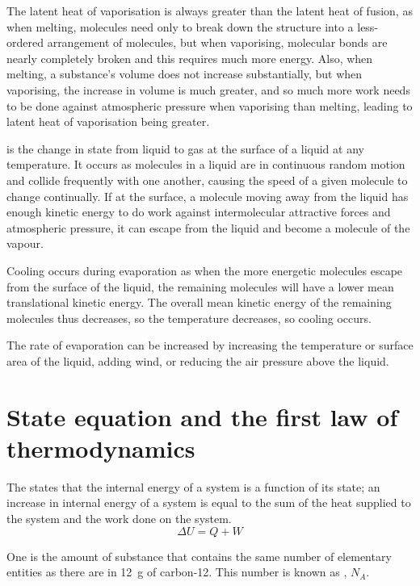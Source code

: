 \documentclass[Physics.tex]{subfiles}
\begin{document}
The latent heat of vaporisation is always greater than the latent heat of fusion, as when melting, molecules need only to break down the structure into a less-ordered arrangement of molecules, but when vaporising, molecular bonds are nearly completely broken and this requires much more energy. Also, when melting, a substance's volume does not increase substantially, but when vaporising, the increase in volume is much greater, and so much more work needs to be done against atmospheric pressure when vaporising than melting, leading to latent heat of vaporisation being greater.

 is the change in state from liquid to gas at the surface of a liquid at any temperature. It occurs as molecules in a liquid are in continuous random motion and collide frequently with one another, causing the speed of a given molecule to change continually. If at the surface, a molecule moving away from the liquid has enough kinetic energy to do work against intermolecular attractive forces and atmospheric pressure, it can escape from the liquid and become a molecule of the vapour.

Cooling occurs during evaporation as when the more energetic molecules escape from the surface of the liquid, the remaining molecules will have a lower mean translational kinetic energy. The overall mean kinetic energy of the remaining molecules thus decreases, so the temperature decreases, so cooling occurs.

The rate of evaporation can be increased by increasing the temperature or surface area of the liquid, adding wind, or reducing the air pressure above the liquid.
\section{State equation and the first law of thermodynamics}
The  states that the internal energy of a system is a function of its state; an increase in internal energy of a system is equal to the sum of the heat supplied to the system and the work done on the system. \begin{equation}\Delta U = Q + W\end{equation}

One  is the amount of substance that contains the same number of elementary entities as there are in \SI{12}{\gram} of carbon-12. This number is known as , \(N_A\).
\end{document}
